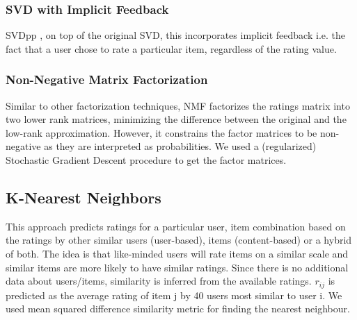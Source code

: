 \documentclass[10pt,conference,compsocconf]{IEEEtran}
\begin{document}
\subsubsection{SVD with Implicit Feedback}
SVDpp \cite{RSH,SVDpp}, on top of the original SVD, this incorporates implicit feedback i.e. the fact that a user chose to rate a particular item, regardless of the rating value.

\subsubsection{Non-Negative Matrix Factorization}
Similar to other factorization techniques, NMF \cite{NMF} factorizes the ratings matrix into two lower rank matrices, minimizing the difference between the original and the low-rank approximation. However, it constrains the factor matrices to be non-negative as they are interpreted as probabilities. We used a (regularized) Stochastic Gradient Descent procedure to get the factor matrices. 


\subsection{K-Nearest Neighbors}
This approach predicts ratings for a particular user, item combination based on the ratings by other similar users (user-based), items (content-based) or a hybrid of both. The idea is that like-minded users will rate items on a similar scale and similar items are more likely to have similar ratings. Since there is no additional data about users/items, similarity is inferred from the available ratings.  $r_{ij}$ is predicted as the average rating of item j by 40 users most similar to user i. We used mean squared difference similarity metric for finding the nearest neighbour. 
\end{document}
